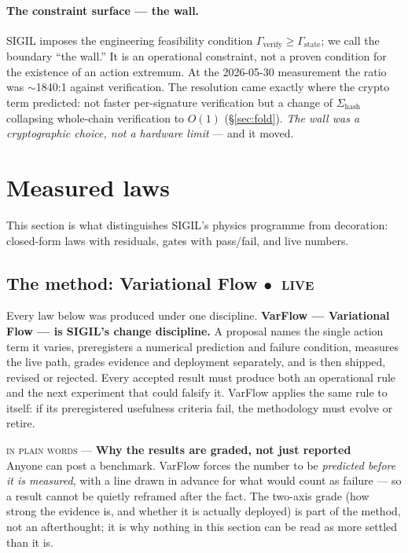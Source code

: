 \documentclass[10pt,a4paper]{article}
\newcommand{\stL}{\textcolor{sigilcyan}{$\bullet$}~{\scriptsize\textcolor{sigilcyan}{\textsc{live}}}}
\newcommand{\layman}[3]{%
\begin{tcolorbox}[enhanced,
  interior style={left color=#1!9,right color=white},
  colframe=#1!45!slate,boxrule=0.5pt,arc=3pt,
  borderline west={2.5pt}{0pt}{#1},
  left=9pt,right=9pt,top=7pt,bottom=7pt]
{\scriptsize\textcolor{#1}{\textsc{in plain words}}\; — \;\textbf{\small #2}}\\[3pt]
\small #3
\end{tcolorbox}}
\begin{document}
\paragraph{The constraint surface — the wall.}
SIGIL imposes the engineering feasibility condition
$\Gamma_{\mathrm{verify}} \ge \Gamma_{\mathrm{state}}$; we call the boundary ``the
wall.'' It is an operational constraint, not a proven condition for the existence of an
action extremum. At the 2026-05-30 measurement the ratio was $\sim$1840:1 against
verification. The resolution came exactly where the crypto term predicted: not faster
per-signature verification but a change of $\Sigma_{\mathrm{hash}}$ collapsing
whole-chain verification to $O(1)$ (\S\ref{sec:fold}). \emph{The wall was a
cryptographic choice, not a hardware limit} — and it moved.

\section{Measured laws}\label{sec:measured}

This section is what distinguishes SIGIL's physics programme from decoration:
closed-form laws with residuals, gates with pass/fail, and live numbers.

\subsection{The method: Variational Flow \hfill \stL}\label{sec:varflow}

Every law below was produced under one discipline. \textbf{VarFlow --- Variational Flow ---
is SIGIL's change discipline.} A proposal names the single action term it varies,
preregisters a numerical prediction and failure condition, measures the live path, grades
evidence and deployment separately, and is then shipped, revised or rejected. Every accepted
result must produce both an operational rule and the next experiment that could falsify it.
VarFlow applies the same rule to itself: if its preregistered usefulness criteria fail, the
methodology must evolve or retire.

\layman{sigilcyan}{Why the results are graded, not just reported}{Anyone can post a
benchmark. VarFlow forces the number to be \emph{predicted before it is measured}, with a
line drawn in advance for what would count as failure --- so a result cannot be quietly
reframed after the fact. The two-axis grade (how strong the evidence is, and whether it is
actually deployed) is part of the method, not an afterthought; it is why nothing in this
section can be read as more settled than it is.}
\end{document}
